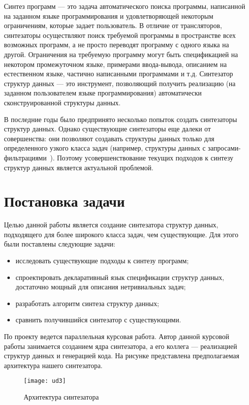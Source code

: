 \documentclass[14pt]{matmex-diploma}
\begin{document}
Синтез программ --- это задача автоматического поиска программы, написанной на заданном языке программирования и удовлетворяющей некоторым ограничениям, которые задает пользователь. В отличие от трансляторов, синтезаторы осуществляют поиск требуемой программы в пространстве всех возможных программ, а не просто переводят программу с одного языка на другой. Ограничения на требуемую программу могут быть спецификацией на некотором промежуточном языке, примерами ввода-вывода, описанием на естественном языке, частично написанными программами и т.д. Синтезатор структур данных --- это инструмент, позволяющий получить реализацию (на заданном пользователем языке программирования) автоматически сконструированной структуры данных.

В последние годы было предпринято несколько попыток создать синтезаторы структур данных. Однако существующие синтезаторы еще далеки от совершенства: они позволяют создавать структуры данных только для определенного узкого класса задач (например, структуры данных с запросами-фильтрациями~\cite{Cozy}). Поэтому усовершенствование текущих подходов к синтезу структур данных является актуальной проблемой.

\section{Постановка задачи}
Целью данной работы является создание синтезатора структур данных, подходящего для более широкого класса задач, чем существующие. Для этого были поставлены следующие задачи:
\begin{itemize}
    \item исследовать существующие подходы к синтезу программ;
    \item спроектировать декларативный язык спецификации структур данных, достаточно мощный для описания нетривиальных задач;
    \item разработать алгоритм синтеза структур данных;
    \item сравнить получившийся синтезатор с существующими.
\end{itemize}
По проекту ведется параллельная курсовая работа. Автор данной курсовой работы занимается созданием ядра синтезатора, а его коллега --- реализацией структур данных и генерацией кода. На рисунке представлена предполагаемая архитектура нашего синтезатора. 
\begin{figure}[h]
\caption{Архитектура синтезатора}
\centering
\texttt{[image: ud3]}
\end{figure}
\end{document}
